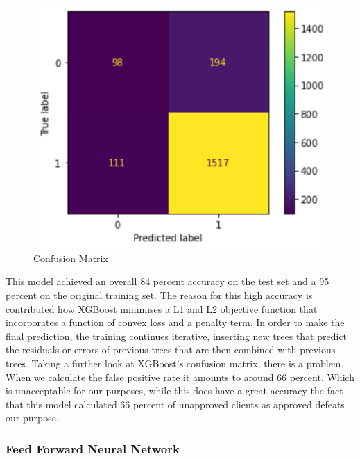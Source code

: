 \documentclass[12pt]{article}
\begin{document}
\begin{figure}
    \centering
    \includegraphics[scale = .30]{figures/XGBconf.png} 
    \caption{Confusion Matrix}
\end{figure}

\noindent This model achieved an overall 84 percent accuracy on the test set and a 95 percent on the original training set. The reason for this high accuracy is contributed how XGBoost minimises a L1 and L2 objective function that incorporates a function of convex loss and a  penalty term. In order to make the final prediction, the training continues iterative, inserting new trees that predict the residuals or errors of previous trees that are then combined with previous trees. Taking a further look at XGBoost's confusion matrix, there is a problem. When we calculate the false positive rate it amounts to around 66 percent. Which is unacceptable for our purposes, while this does have a great accuracy the fact that this model calculated 66 percent of unapproved clients as approved defeats our purpose.

\subsubsection{Feed Forward Neural Network}
\end{document}
